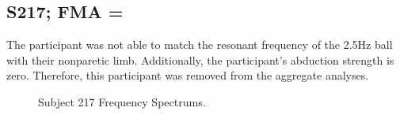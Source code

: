 \documentclass{article}
\begin{document}
\clearpage
\subsection{S217; FMA =}

The participant was not able to match the resonant frequency of the 2.5Hz ball with their nonparetic limb. Additionally, the participant's abduction strength is zero. Therefore, this participant was removed from the aggregate analyses.

\begin{figure}[!ht]
     \centering
     \hfill
     \hfill
	\caption{Subject 217 Frequency Spectrums.}
\end{figure}
\end{document}
